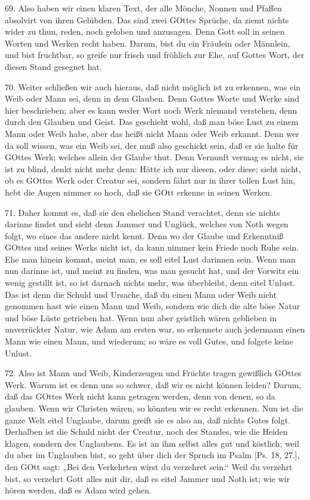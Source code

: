 69. Also haben wir einen klaren Text, der alle Mönche, Nonnen und Pfaffen absolvirt von ihren Gelübden. Das sind zwei GOttes Sprüche, da ziemt nichts wider zu thun, reden, noch geloben und anzusagen. Denn Gott soll in seinen Worten und Werken recht haben. Darum, bist du ein Fräulein oder Männlein, und bist fruchtbar, so greife nur frisch und fröhlich zur Ehe, auf Gottes Wort, der diesen Stand gesegnet hat.

70. Weiter schließen wir auch hieraus, daß nicht möglich ist zu erkennen, was ein Weib oder Mann sei, denn in dem Glauben. Denn Gottes Worte und Werke sind hier beschrieben; aber es kann weder Wort noch Werk niemand verstehen, denn durch den Glauben und Geist. Das geschieht wohl, daß man böse Lust zu einem Mann oder Weib habe, aber das heißt nicht Mann oder Weib erkannt. Denn wer da soll wissen, was ein Weib sei, der muß also geschickt sein, daß er sie halte für GOttes Werk; welches allein der Glaube thut. Denn Vernunft vermag es nicht, sie ist zu blind, denkt nicht mehr denn: Hätte ich nur diesen, oder diese; sieht nicht, ob es GOttes Werk oder Creatur sei, sondern fährt nur in ihrer tollen Lust hin, hebt die Augen nimmer so hoch, daß sie GOtt erkenne in seinen Werken.

71. Daher kommt es, daß sie den ehelichen Stand verachtet, denn sie nichts darinne findet und sieht denn Jammer und Unglück, welches von Noth wegen folgt, wo eines das andere nicht kennt. Denn wo der Glaube und Erkenntniß GOttes und seines Werks nicht ist, da kann nimmer kein Friede noch Ruhe sein. Ehe man hinein kommt, meint man, es soll eitel Lust darinnen sein. Wenn man nun darinne ist, und meint zu finden, was man gesucht hat, und der Vorwitz ein wenig gestillt ist, so ist darnach nichts mehr, was überbleibt, denn eitel Unlust. Das ist denn die Schuld und Ursache, daß du einen Mann oder Weib nicht genommen hast wie einen Mann und Weib, sondern wie dich die alte böse Natur und böse Lüste getrieben hat. Wenn nun aber geistlich wären geblieben in unverrückter Natur, wie Adam am ersten war, so erkennete auch jedermann einen Mann wie einen Mann, und wiederum; so wäre es voll Gutes, und folgete keine Unlust.

72. Also ist Mann und Weib, Kinderzeugen und Früchte tragen gewißlich GOttes Werk. Warum ist es denn uns so schwer, daß wir es nicht können leiden? Darum, daß das GOttes Werk nicht kann getragen werden, denn von denen, so da glauben. Wenn wir Christen wären, so könnten wir es recht erkennen. Nun ist die ganze Welt eitel Unglaube, darum greift sie es also an, daß nichts Gutes folgt. Derhalben ist die Schuld nicht der Creatur, noch des Standes, wie die Heiden klagen, sondern des Unglaubens. Es ist an ihm selbst alles gut und köstlich; weil du aber im Unglauben bist, so geht über dich der Spruch im Psalm [Ps. 18, 27.], den GOtt sagt: „Bei den Verkehrten wirst
du verzehret sein.“ Weil du verzehrt bist, so verzehrt Gott alles mit dir, daß es eitel Jammer und Noth ist; wie wir hören werden, daß es Adam wird gehen.

